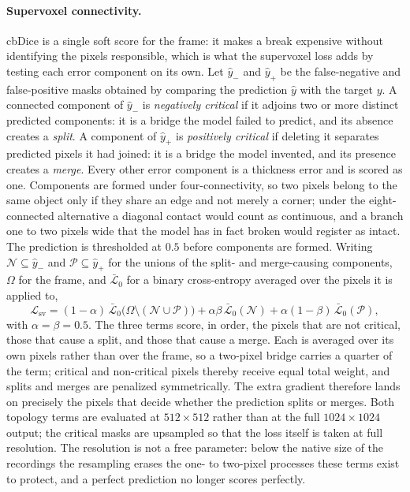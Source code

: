 \documentclass[11pt,a4paper]{article}
\begin{document}
\paragraph{Supervoxel connectivity.}
cbDice is a single soft score for the frame: it makes a break expensive
without identifying the pixels responsible, which is what the supervoxel
loss \cite{grim2025supervoxel} adds by testing each error component on its
own. Let $\hat{y}_-$ and $\hat{y}_+$ be the false-negative and
false-positive masks obtained by comparing the prediction $\hat{y}$ with the
target $y$. A connected component of $\hat{y}_-$ is \emph{negatively
critical} if it adjoins two or more distinct predicted components: it is a
bridge the model failed to predict, and its absence creates a \emph{split}.
A component of $\hat{y}_+$ is \emph{positively critical} if deleting it
separates predicted pixels it had joined: it is a bridge the model invented,
and its presence creates a \emph{merge}. Every other error component is a
thickness error and is scored as one. Components are formed under
four-connectivity, so two pixels belong to the same object only if they
share an edge and not merely a corner; under the eight-connected
alternative a diagonal contact would count as continuous, and a branch one
to two pixels wide that the model has in fact broken would register as
intact. The prediction is thresholded at $0.5$ before components are formed.
Writing $\mathcal{N} \subseteq \hat{y}_-$ and
$\mathcal{P} \subseteq \hat{y}_+$ for the unions of the split- and
merge-causing components, $\Omega$ for the frame, and $\bar{\mathcal{L}}_0$
for a binary cross-entropy averaged over the pixels it is applied to,
\begin{equation}
\mathcal{L}_{\text{sv}}
 = (1-\alpha)\,\bar{\mathcal{L}}_0\big(\Omega \setminus (\mathcal{N} \cup \mathcal{P})\big)
 + \alpha\beta\,\bar{\mathcal{L}}_0(\mathcal{N})
 + \alpha(1-\beta)\,\bar{\mathcal{L}}_0(\mathcal{P}),
\label{eq:sv}
\end{equation}
with $\alpha = \beta = 0.5$. The three terms score, in order, the pixels
that are not critical, those that cause a split, and those that cause a
merge. Each is averaged over its own pixels rather than over the frame, so a
two-pixel bridge carries a quarter of the term; critical and non-critical
pixels thereby receive equal total weight, and splits and merges are
penalized symmetrically. The extra gradient therefore lands on precisely the
pixels that decide whether the prediction splits or merges. Both topology terms
are evaluated at $512\times512$ rather than at the full $1024\times1024$
output; the critical masks are upsampled so that the loss itself is taken at
full resolution. The resolution is not a free parameter: below the native
size of the recordings the resampling erases the one- to two-pixel processes
these terms exist to protect, and a perfect prediction no longer scores
perfectly.
\end{document}
